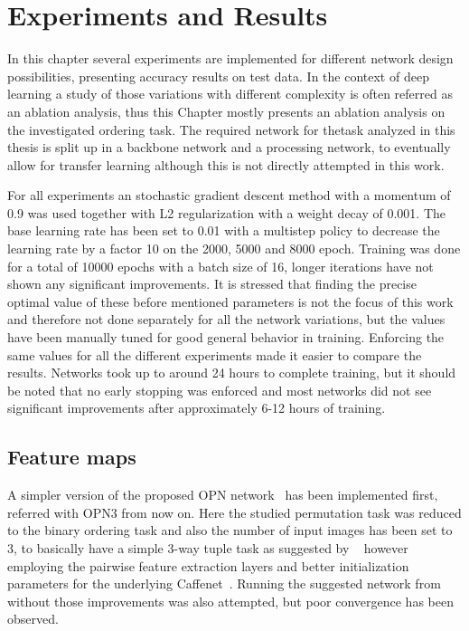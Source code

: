 %
\newpage
\chapter{Experiments and Results}
\label{ch:experimentsandresults}
In this chapter several experiments are implemented for different network design possibilities, presenting accuracy results on test data. In the context of deep learning a study of those variations with different complexity is often referred as an ablation analysis, thus this Chapter mostly presents an ablation analysis on the investigated ordering task. The required network for thetask analyzed in this thesis is split up in a backbone network and a processing network, to eventually allow for transfer learning although this is not directly attempted in this work.

For all experiments an stochastic gradient descent method with a momentum of 0.9 was used together with L2 regularization with a weight decay of 0.001. The base learning rate has been set to 0.01 with a multistep policy to decrease the learning rate by a factor 10 on the 2000, 5000 and 8000 epoch. Training was done for a total of 10000 epochs with a batch size of 16, longer iterations have not shown any significant improvements. It is stressed that finding the precise optimal value of these before mentioned parameters is not the focus of this work and therefore not done separately for all the network variations, but the values have been manually tuned for good general behavior in training. Enforcing the same values for all the different experiments made it easier to compare the results. Networks took up to around 24 hours to complete training, but it should be noted that no early stopping was enforced and most networks did not see significant improvements after approximately 6-12 hours of training.

\section{Feature maps}
A simpler version of the proposed OPN network~\cite{lee2017} has been implemented first, referred with OPN3 from now on. Here the studied permutation task was reduced to the binary ordering task and also the number of input images has been set to 3, to basically have a simple 3-way tuple task as suggested by ~\cite{misra2016} however employing the pairwise feature extraction layers and better initialization parameters for the underlying Caffenet~\cite{jia2014}. Running the suggested network from~\cite{misra2016} without those improvements was also attempted, but poor convergence has been observed. 

